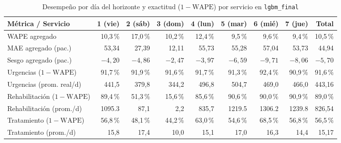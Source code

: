 \begin{table}[t]
\caption{Desempeño por día del horizonte y exactitud ($1-\text{WAPE}$) por servicio en \texttt{lgbm\_final}}
\label{tab:anexo_horizonte}
\centering
\scriptsize
\begin{tabularx}{\textwidth}{@{}Y r r r r r r r r@{}}
\toprule
Métrica / Servicio & 1 (vie) & 2 (sáb) & 3 (dom) & 4 (lun) & 5 (mar) & 6 (mié) & 7 (jue) & Total \\
\midrule
WAPE agregado & 10,3\,\% & 17,0\,\% & 10,2\,\% & 12,4\,\% & 9,5\,\% & 9,6\,\% & 9,4\,\% & 10,5\,\% \\
MAE agregado (pac.) & 53,34 & 27,39 & 12,11 & 55,73 & 55,28 & 57,04 & 53,73 & 44,94 \\
Sesgo agregado (pac.) & $-4{,}20$ & $-4{,}86$ & $-2{,}47$ & $-3{,}97$ & $-6{,}59$ & $-9{,}71$ & $-8{,}06$ & $-5{,}70$ \\
\midrule
Urgencias ($1-\text{WAPE}$) & 91,7\,\% & 91,9\,\% & 91,6\,\% & 91,7\,\% & 91,3\,\% & 92,4\,\% & 90,9\,\% & 91,6\,\% \\
Urgencias (prom. real/d) & 441,5 & 379,8 & 344,2 & 496,8 & 504,7 & 469,0 & 466,0 & 443,16 \\
Rehabilitación ($1-\text{WAPE}$) & 89,4\,\% & 51,3\,\% & 15,6\,\% & 85,6\,\% & 90,6\,\% & 90,0\,\% & 90,9\,\% & 89,0\,\% \\
Rehabilitación (prom./d) & \num{1095,3} & 87,1 & 2,2 & 835,7 & \num{1219,5} & \num{1306,2} & \num{1239,8} & 826,54 \\
Tratamiento ($1-\text{WAPE}$) & 56,8\,\% & 48,1\,\% & 44,2\,\% & 63,0\,\% & 54,6\,\% & 68,5\,\% & 56,8\,\% & 56,5\,\% \\
Tratamiento (prom./d) & 15,8 & 17,4 & 10,0 & 15,1 & 17,0 & 16,3 & 14,4 & 15,17 \\
\bottomrule
\end{tabularx}
\end{table}

